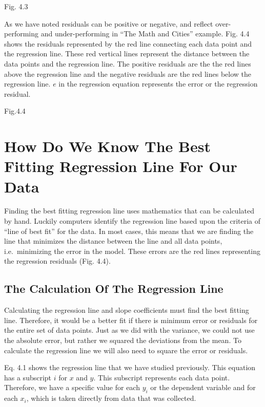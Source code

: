 \documentclass[]{book}
\theoremstyle{definition}
\theoremstyle{definition}
\theoremstyle{definition}
\theoremstyle{remark}
\begin{document}
Fig. 4.3

As we have noted residuals can be positive or negative, and reflect
over-performing and under-performing in ``The Math and Cities'' example.
Fig. 4.4 shows the residuals represented by the red line connecting each
data point and the regression line. These red vertical lines represent
the distance between the data points and the regression line. The
positive residuals are the the red lines above the regression line and
the negative residuals are the red lines below the regression line.
\({e}\) in the regression equation represents the error or the
regression residual.

Fig.4.4

\hypertarget{how-do-we-know-the-best-fitting-regression-line-for-our-data}{%
\section{How Do We Know The Best Fitting Regression Line For Our
Data}\label{how-do-we-know-the-best-fitting-regression-line-for-our-data}}

Finding the best fitting regression line uses mathematics that can be
calculated by hand. Luckily computers identify the regression line based
upon the criteria of ``line of best fit'' for the data. In most cases,
this means that we are finding the line that minimizes the distance
between the line and all data points, i.e.~minimizing the error in the
model. These errors are the red lines representing the regression
residuals (Fig. 4.4).

\hypertarget{the-calculation-of-the-regression-line}{%
\subsection{The Calculation Of The Regression
Line}\label{the-calculation-of-the-regression-line}}

Calculating the regression line and slope coefficients must find the
best fitting line. Therefore, it would be a better fit if there is
minimum error or residuals for the entire set of data points. Just as we
did with the variance, we could not use the absolute error, but rather
we squared the deviations from the mean. To calculate the regression
line we will also need to square the error or residuals.

Eq. 4.1 shows the regression line that we have studied previously. This
equation has a subscript \({i}\) for \({x}\) and \({y}\). This subscript
represents each data point. Therefore, we have a specific value for each
\(y_{i}\) or the dependent variable and for each \(x_{i}\), which is
taken directly from data that was collected.
\end{document}
